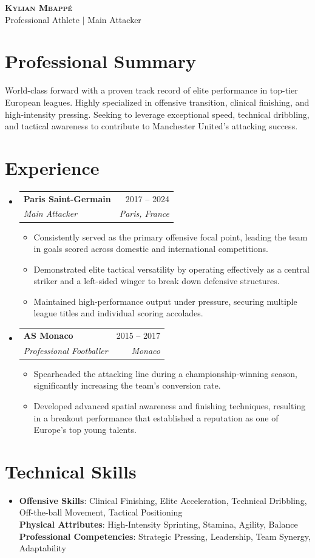 \documentclass[letterpaper,11pt]{article}
\makeatletter
\newcommand{\resumeItem}[1]{
\item\small{
{#1 \vspace{-2pt}}
}
}
\newcommand{\resumeSubheading}[4]{
\vspace{-2pt}\item
\begin{tabular*}{0.97\textwidth}[t]{l@{\extracolsep{\fill}}r}
\textbf{#1} & #2 \\
\textit{\small#3} & \textit{\small #4} \\
\end{tabular*}\vspace{-7pt}
}
\newcommand{\resumeSubHeadingListStart}{\begin{itemize}[leftmargin=0.15in, label={}]}
\newcommand{\resumeSubHeadingListEnd}{\end{itemize}}
\newcommand{\resumeItemListStart}{\begin{itemize}}
\newcommand{\resumeItemListEnd}{\end{itemize}\vspace{-5pt}}
\makeatother
\begin{document}
\begin{center}
\textbf{\Huge \scshape Kylian Mbappé} \\ \vspace{1pt}
\small Professional Athlete $|$ Main Attacker
\end{center}

\section{Professional Summary}
World-class forward with a proven track record of elite performance in top-tier European leagues. Highly specialized in offensive transition, clinical finishing, and high-intensity pressing. Seeking to leverage exceptional speed, technical dribbling, and tactical awareness to contribute to Manchester United's attacking success.

\section{Experience}
\resumeSubHeadingListStart
\resumeSubheading{Paris Saint-Germain}{2017 -- 2024}{Main Attacker}{Paris, France}
\resumeItemListStart
\resumeItem{Consistently served as the primary offensive focal point, leading the team in goals scored across domestic and international competitions.}
\resumeItem{Demonstrated elite tactical versatility by operating effectively as a central striker and a left-sided winger to break down defensive structures.}
\resumeItem{Maintained high-performance output under pressure, securing multiple league titles and individual scoring accolades.}
\resumeItemListEnd

\resumeSubheading{AS Monaco}{2015 -- 2017}{Professional Footballer}{Monaco}
\resumeItemListStart
\resumeItem{Spearheaded the attacking line during a championship-winning season, significantly increasing the team's conversion rate.}
\resumeItem{Developed advanced spatial awareness and finishing techniques, resulting in a breakout performance that established a reputation as one of Europe's top young talents.}
\resumeItemListEnd
\resumeSubHeadingListEnd

\section{Technical Skills}
\begin{itemize}[leftmargin=0.15in, label={}]
\item{
\textbf{Offensive Skills}{: Clinical Finishing, Elite Acceleration, Technical Dribbling, Off-the-ball Movement, Tactical Positioning} \\
\textbf{Physical Attributes}{: High-Intensity Sprinting, Stamina, Agility, Balance} \\
\textbf{Professional Competencies}{: Strategic Pressing, Leadership, Team Synergy, Adaptability}
}
\end{itemize}
\end{document}
